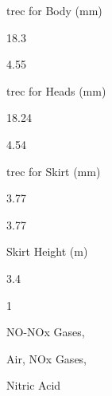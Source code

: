 \documentclass[a4paper,portrait,12pt]{article}
\begin{document}
\begin{flushleft}
trec for Body (mm)
\end{flushleft}





18.3





4.55





\begin{flushleft}
trec for Heads (mm)
\end{flushleft}





18.24





4.54





\begin{flushleft}
trec for Skirt (mm)
\end{flushleft}





3.77





3.77





\begin{flushleft}
Skirt Height (m)
\end{flushleft}





3.4





1





\begin{flushleft}
NO-NOx Gases,
\end{flushleft}





\begin{flushleft}
Air, NOx Gases,
\end{flushleft}





\begin{flushleft}
Nitric Acid
\end{flushleft}
\end{document}
